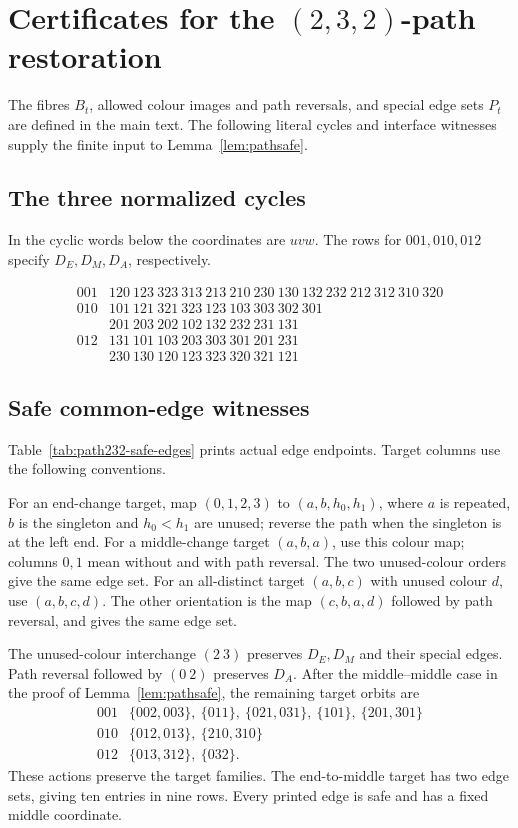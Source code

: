 \documentclass[11pt]{article}
\theoremstyle{remark}
\numberwithin{equation}{section}
\numberwithin{table}{section}
\begin{document}
\clearpage
\section{Certificates for the \texorpdfstring{$(2,3,2)$}{(2,3,2)}-path restoration}
\label{app:path232-certificates}
The fibres $B_t$, allowed colour images and path reversals, and special
edge sets $P_t$ are defined in the main text. The following literal
cycles and interface witnesses supply the finite input to
Lemma~\ref{lem:pathsafe}.

\subsection{The three normalized cycles}
In the cyclic words below the coordinates are $uvw$. The rows for
$001,010,012$ specify $D_E,D_M,D_A$, respectively.

\begin{equation}
\label{eq:path232-cycles}
\begin{array}{c|l}
001&120\ 123\ 323\ 313\ 213\ 210\ 230\ 130\ 132\ 232\ 212\ 312\ 310\ 320\\[2pt]
010&101\ 121\ 321\ 323\ 123\ 103\ 303\ 302\ 301\\
   &201\ 203\ 202\ 102\ 132\ 232\ 231\ 131\\[2pt]
012&131\ 101\ 103\ 203\ 303\ 301\ 201\ 231\\
   &230\ 130\ 120\ 123\ 323\ 320\ 321\ 121
\end{array}
\end{equation}

\subsection{Safe common-edge witnesses}
Table~\ref{tab:path232-safe-edges} prints actual edge endpoints.
Target columns use the following conventions.

For an end-change target, map $(0,1,2,3)$ to $(a,b,h_0,h_1)$,
where $a$ is repeated, $b$ is the singleton and $h_0<h_1$ are unused;
reverse the path when the singleton is at the left end.
For a middle-change target $(a,b,a)$, use this colour map; columns
$0,1$ mean without and with path reversal. The two unused-colour
orders give the same edge set.
For an all-distinct target $(a,b,c)$ with unused colour $d$, use
$(a,b,c,d)$. The other orientation is the map $(c,b,a,d)$ followed
by path reversal, and gives the same edge set.

The unused-colour interchange $(2\ 3)$ preserves $D_E,D_M$
and their special edges. Path reversal followed by $(0\ 2)$
preserves $D_A$. After the middle--middle case in the proof
of Lemma~\ref{lem:pathsafe}, the remaining target orbits are
\[
\begin{array}{c|l}
001&\{002,003\},\ \{011\},\ \{021,031\},\ \{101\},\ \{201,301\}\\
010&\{012,013\},\ \{210,310\}\\
012&\{013,312\},\ \{032\}.
\end{array}
\]
These actions preserve the target families. The end-to-middle target
has two edge sets, giving ten entries in nine rows. Every printed
edge is safe and has a fixed middle coordinate.
\end{document}
